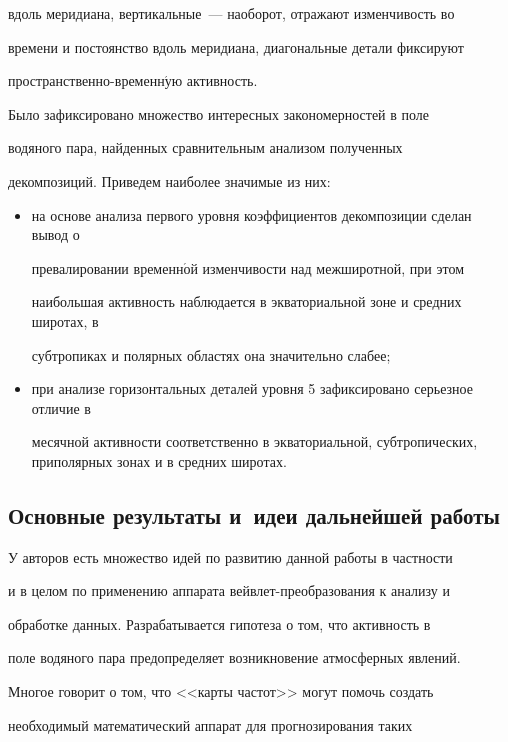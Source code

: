 вдоль меридиана, вертикальные~--- наоборот, отражают изменчивость во

времени и постоянство вдоль меридиана, диагональные детали фиксируют

про\-стран\-ст\-вен\-но-вре\-мен\-н$\acute{\mbox{у}}$ю активность.



Было зафиксировано множество интересных закономерностей в поле

водяного пара, найденных сравнительным анализом полученных

декомпозиций. Приведем наиболее значимые из них:

\begin{itemize}

    \item на основе анализа первого уровня коэффициентов декомпозиции сделан вывод о 

    превалировании временн$\acute{\mbox{о}}$й изменчивости над межширотной, при этом 

    наибольшая активность наблюдается в экваториальной зоне и средних широтах, в 

    субтропиках и полярных областях она значительно слабее;

    \item при анализе горизонтальных деталей уровня 5 зафиксировано серьезное отличие в 

     месячной активности соответственно в экваториальной, субтропических, приполярных зонах и в средних широтах.

\end{itemize}



\subsection{Основные результаты и~идеи дальнейшей работы}



У авторов есть множество идей по развитию данной работы в частности

и в целом по применению аппарата вейвлет-преобразования к анализу и

обработке данных. Разрабатывается гипотеза о том, что активность в

поле водяного пара предопределяет возникновение атмосферных явлений.

Многое говорит о том, что <<карты частот>> могут помочь создать

необходимый математический аппарат для прогнозирования таких

